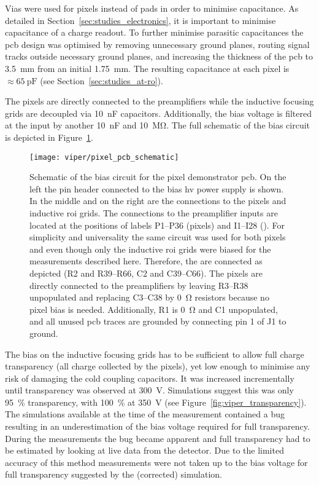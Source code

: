 Vias were used for pixels instead of pads in order to minimise capacitance.
As detailed in Section~\ref{sec:studies_electronics}, it is important to minimise capacitance of a charge readout.
To further minimise parasitic capacitances the \gls{pcb} design was optimised by removing unnecessary ground planes, routing signal tracks outside necessary ground planes, and increasing the thickness of the \gls{pcb} to \SI{3.5}{\milli\metre} from an initial \SI{1.75}{\milli\metre}. 
The resulting capacitance at each pixel is $\approx \SI{65}{\pico\farad}$ (see Section~\ref{sec:studies_at-ro}).

The pixels are directly connected to the preamplifiers while the inductive focusing grids are decoupled via \SI{10}{\nano\farad} capacitors.
Additionally, the bias voltage is filtered at the input by another \SI{10}{\nano\farad} and \SI{10}{\mega\ohm}.
The full schematic of the bias circuit is depicted in Figure~\ref{fig:viper_pcb_schematic}.

\begin{figure}[tbp]
	\centering
	\texttt{[image: viper/pixel\_pcb\_schematic]}
	\caption[Pixel demonstrator bias circuit]{%
		Schematic of the bias circuit for the \AC{} pixel demonstrator \acrshort{pcb}.
		On the left the pin header connected to the bias \acrshort{hv} power supply is shown. In the middle and on the right are the connections to the pixels and inductive \acrshort{roi} grids.
		The connections to the preamplifier inputs are located at the positions of labels P1--P36 (pixels) and I1--I28 ().
		For simplicity and universality the same circuit was used for both pixels and  even though only the inductive \acrshort{roi} grids were biased for the measurements described here.
		Therefore, the  are connected as depicted (R2 and R39--R66, C2 and C39--C66).
		The pixels are directly connected to the preamplifiers by leaving R3--R38 unpopulated and replacing C3--C38 by \SI{0}{\ohm} resistors because no pixel bias is needed.
		Additionally, R1 is \SI{0}{\ohm} and C1 unpopulated, and all unused \acrshort{pcb} traces are grounded by connecting pin 1 of J1 to ground.
	}
	\label{fig:viper_pcb_schematic}
\end{figure}

The bias on the inductive focusing grids has to be sufficient to allow full charge transparency (all charge collected by the pixels), yet low enough to minimise any risk of damaging the cold coupling capacitors.
It was increased incrementally until transparency was observed at \SI{300}{\volt}. 
Simulations suggest this was only \SI{95}{\percent} transparency, with \SI{100}{\percent} at \SI{350}{\volt} (see Figure~\ref{fig:viper_transparency}).
The simulations available at the time of the measurement contained a bug resulting in an underestimation of the bias voltage required for full transparency.
During the measurements the bug became apparent and full transparency had to be estimated by looking at live data from the detector.
Due to the limited accuracy of this method measurements were not taken up to the bias voltage for full transparency suggested by the (corrected) simulation.~\cite{francypants}

